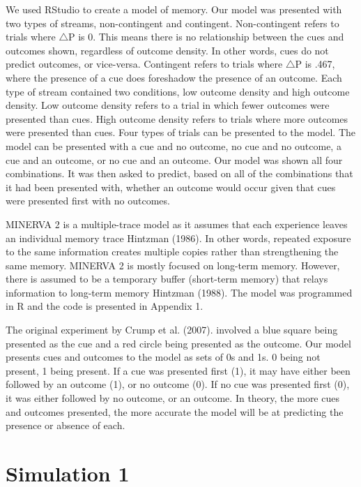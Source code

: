 \documentclass[
  english,
  man,floatsintext]{apa6}
\begin{document}
We used RStudio to create a model of memory. Our model was presented with two types of streams, non-contingent and contingent. Non-contingent refers to trials where \(\triangle\)P is 0. This means there is no relationship between the cues and outcomes shown, regardless of outcome density. In other words, cues do not predict outcomes, or vice-versa. Contingent refers to trials where \(\triangle\)P is .467, where the presence of a cue does foreshadow the presence of an outcome. Each type of stream contained two conditions, low outcome density and high outcome density. Low outcome density refers to a trial in which fewer outcomes were presented than cues. High outcome density refers to trials where more outcomes were presented than cues. Four types of trials can be presented to the model. The model can be presented with a cue and no outcome, no cue and no outcome, a cue and an outcome, or no cue and an outcome. Our model was shown all four combinations. It was then asked to predict, based on all of the combinations that it had been presented with, whether an outcome would occur given that cues were presented first with no outcomes.

MINERVA 2 is a multiple-trace model as it assumes that each experience leaves an individual memory trace Hintzman (1986). In other words, repeated exposure to the same information creates multiple copies rather than strengthening the same memory. MINERVA 2 is mostly focused on long-term memory. However, there is assumed to be a temporary buffer (short-term memory) that relays information to long-term memory Hintzman (1988). The model was programmed in R and the code is presented in Appendix 1.

The original experiment by Crump et al. (2007). involved a blue square being presented as the cue and a red circle being presented as the outcome. Our model presents cues and outcomes to the model as sets of 0s and 1s. 0 being not present, 1 being present. If a cue was presented first (1), it may have either been followed by an outcome (1), or no outcome (0). If no cue was presented first (0), it was either followed by no outcome, or an outcome. In theory, the more cues and outcomes presented, the more accurate the model will be at predicting the presence or absence of each.

\hypertarget{simulation-1}{%
\section{Simulation 1}\label{simulation-1}}
\end{document}
